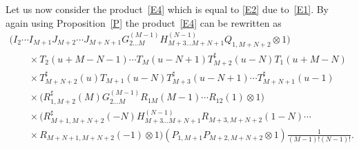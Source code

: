 \documentclass[10pt,a4paper]{amsart}
\numberwithin{equation}{section}
\def\ot{\otimes}
\def\RS{R^{\sharp}}
\def\TS{T^{\sharp}}
\begin{document}
Let us now consider the product~\eqref{E4} which
is equal to \eqref{E2} due to~\eqref{E1}.
By again using Proposition~\ref{P}
the product~\eqref{E4} can be rewritten as
\begin{gather*}
 \big( I_{2} \cdots I_{M+1}
J_{M+2} \cdots J_{M+N+1}
G_{2 \dots M}^{(M-1)} H_{M+3 \dots M+N+1}^{(N-1)}
Q_{1,M+N+2}\ot1 \big)\\
\qquad{} \times
 T_2 (u+M-N-1) \cdots T_{M} (u-N+1)
\TS_{M+2} (u-N) T_1 (u+M-N)\\
\qquad{} \times \TS_{M+N+2} (u) T_{M+1} (u-N)
\TS_{M+3} (u-N+1) \cdots \TS_{M+N+1} (u-1)\\
\qquad{} \times \big( \RS_{1,M+2} (M ) G_{2 \dots M}^{(M-1)}
R_{1M} (M-1) \cdots R_{12} (1)\ot1 \big)\\
\qquad{} \times \big( \RS_{M+1,M+N+2} (-N ) H_{M+3 \dots M+N+1}^{(N-1)}
R_{M+3,M+N+2} (1-N) \cdots\\
\qquad{} \times R_{M+N+1,M+N+2} (-1)\ot1 \big) ( P_{1,M+1} P_{M+2,M+N+2}\ot1 )
\frac1{(M-1) ! (N-1) !} .
\end{gather*}
\end{document}
